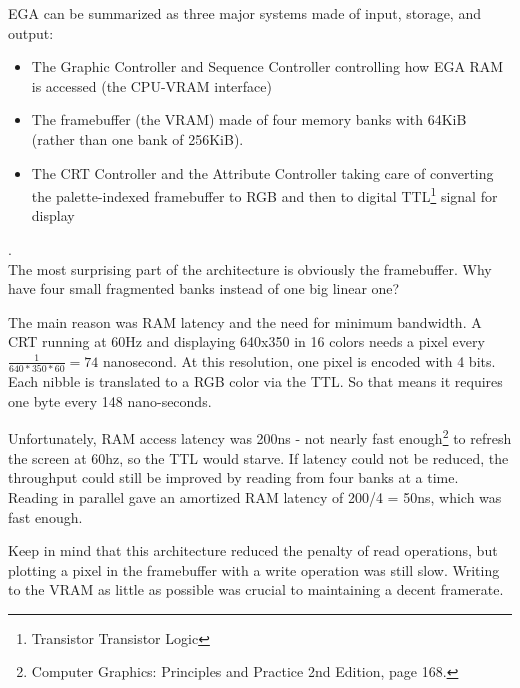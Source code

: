 \documentclass[book.tex]{subfiles}
\begin{document}
EGA can be summarized as three major systems made of input, storage, and output:
\begin{itemize}
\item The Graphic Controller and Sequence Controller controlling how EGA RAM is accessed (the CPU-VRAM interface)
\item The framebuffer (the VRAM) made of four memory banks with 64KiB (rather than one bank of 256KiB).  
\item The CRT Controller and the Attribute Controller taking care of converting the palette-indexed framebuffer to RGB and then to digital TTL\footnote{Transistor Transistor Logic} signal for display
\end{itemize}

\par
{}.\\

The most surprising part of the architecture is obviously the framebuffer. Why have four small fragmented banks instead of one big linear one?\\
\par
The main reason was RAM latency and the need for minimum bandwidth. A CRT running at 60Hz and displaying 640x350 in 16 colors needs a pixel every $\frac{1}{640*350*60}=74$ nanosecond. At this resolution, one pixel is encoded with 4 bits. Each nibble is translated to a RGB color via the TTL. So that means it requires one byte every 148 nano-seconds.\\
\par
 Unfortunately, RAM access latency was 200ns - not nearly fast enough\footnote{Computer Graphics: Principles and Practice 2nd Edition, page 168.} to refresh the screen at 60hz, so the TTL would starve. If latency could not be reduced, the throughput could still be improved by reading from four banks at a time. Reading in parallel gave an amortized RAM latency of 200/4 = 50ns, which was fast enough.\\
\par
Keep in mind that this architecture reduced the penalty of read operations, but plotting a pixel in the framebuffer with a write operation was still slow. Writing to the VRAM as little as possible was crucial to maintaining a decent framerate. 
\end{document}
